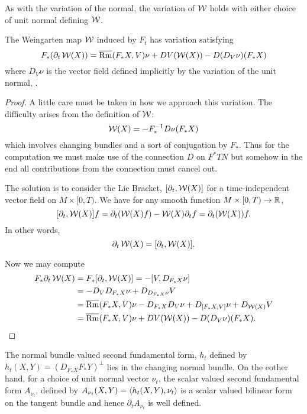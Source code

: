 As with the variation of the normal, the variation of \(\operatorname{\mathcal{W}}\) holds with either choice of unit normal defining \(\operatorname{\mathcal{W}}\).

\begin{lemma}
\label{lem:dt_W}
The Weingarten map \(\operatorname{\mathcal{W}}\) induced by \(F_t\) has variation satisfying
\[
F_{\ast} (\partial_t \operatorname{\mathcal{W}} (X)) = \overline{\operatorname{Rm}} (F_{\ast} X, V)\nu + DV (\operatorname{\mathcal{W}} (X)) - D(D_V \nu) ({F_{\ast} X})
\]
where \(D_V \nu\) is the vector field defined implicitly by the variation of the unit normal, .
\end{lemma}

\begin{proof}
A little care must be taken in how we approach this variation. The difficulty arises from the definition of \(\operatorname{\mathcal{W}}\):
\[
\operatorname{\mathcal{W}}(X) = -F_{\ast}^{-1} D\nu(F_{\ast} X)
\]
which involves changing bundles and a sort of conjugation by \(F_{\ast}\). Thus for the computation we must make use of the connection \(D\) on \(F^{\ast} TN\) but somehow in the end all contributions from the connection must cancel out.

The solution is to consider the Lie Bracket, \([\partial_t, \operatorname{\mathcal{W}}(X)]\) for a time-independent vector field on \(M \times [0, T)\). We have for any smooth function \(M \times [0, T) \to \mathbb{R}\),
\[
[\partial_t, \operatorname{\mathcal{W}}(X)] f = \partial_t (\operatorname{\mathcal{W}}(X) f) - \operatorname{\mathcal{W}}(X) \partial_t f = \partial_t (\operatorname{\mathcal{W}}(X)) f.
\]
In other words,
\[
\partial_t \operatorname{\mathcal{W}}(X) = [\partial_t, \operatorname{\mathcal{W}}(X)].
\]

Now we may compute
\[
\begin{split}
F_{\ast} \partial_t \operatorname{\mathcal{W}}(X) &= F_{\ast} [\partial_t, \operatorname{\mathcal{W}}(X)] = -[V, D_{F_{\ast} X} \nu] \\
&= -D_V D_{F_{\ast} X} \nu + D_{D_{F_{\ast} X} \nu} V \\
&= \overline{\operatorname{Rm}} (F_{\ast} X, V)\nu - D_{F_{\ast} X} D_V \nu + D_{[F_{\ast} X, V]} \nu + D_{\operatorname{\mathcal{W}}(X)} V \\
&= \overline{\operatorname{Rm}} (F_{\ast} X, V)\nu + DV (\operatorname{\mathcal{W}} (X)) - D(D_V \nu) ({F_{\ast} X}).
\end{split}
\]
\end{proof}

The normal bundle valued second fundamental form, \(h_t\) defined by \(h_t(X, Y) = (D_{F_{\ast} X} F_{\ast} Y)^{\perp}\) lies in the changing normal bundle. On the eother hand, for a choice of unit normal vector \(\nu_t\), the scalar valued second fundamental form \(A_{\nu_t}\), defined by \(A_{\nu_t} (X, Y) = \left\langle h_t(X, Y),\nu_t \right\rangle\) is a scalar valued bilinear form on the tangent bundle and hence \(\partial_t A_{\nu_t}\) is well defined.

